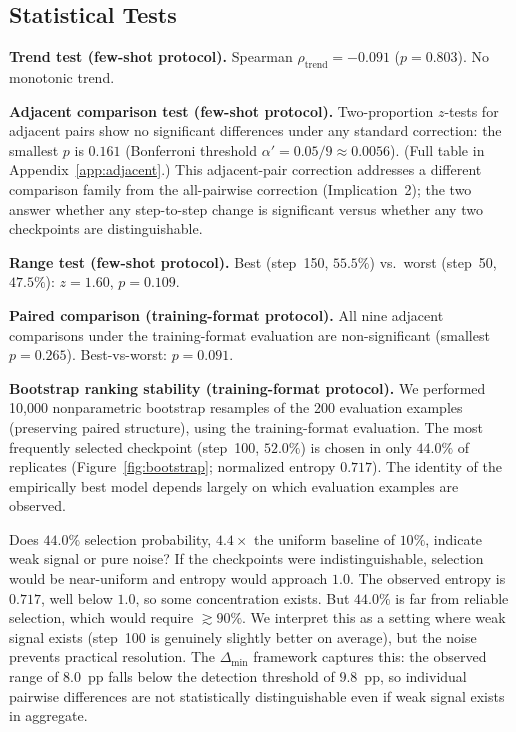 \documentclass[pdflatex,sn-mathphys-ay,oneside]{sn-jnl}
\theoremstyle{thmstylethree}
\begin{document}
\subsection{Statistical Tests}

\textbf{Trend test (few-shot protocol).} Spearman $\rho_{\text{trend}}=-0.091$ ($p=0.803$). No monotonic trend.

\textbf{Adjacent comparison test (few-shot protocol).} Two-proportion $z$-tests for adjacent pairs show no significant differences under any standard correction: the smallest $p$ is $0.161$ (Bonferroni threshold $\alpha' = 0.05/9 \approx 0.0056$). (Full table in Appendix~\ref{app:adjacent}.) This adjacent-pair correction addresses a different comparison family from the all-pairwise correction (Implication~2); the two answer whether any step-to-step change is significant versus whether any two checkpoints are distinguishable.

\textbf{Range test (few-shot protocol).} Best (step~150, $55.5\%$) vs.\ worst (step~50, $47.5\%$): $z=1.60$, $p=0.109$.

\textbf{Paired comparison (training-format protocol).} All nine adjacent comparisons under the training-format evaluation are non-significant (smallest $p=0.265$). Best-vs-worst: $p=0.091$.

\textbf{Bootstrap ranking stability (training-format protocol).} We performed 10,000 nonparametric bootstrap resamples of the 200 evaluation examples (preserving paired structure), using the training-format evaluation. The most frequently selected checkpoint (step~100, $52.0\%$) is chosen in only $44.0\%$ of replicates (Figure~\ref{fig:bootstrap}; normalized entropy $0.717$). The identity of the empirically best model depends largely on which evaluation examples are observed.

Does $44.0\%$ selection probability, $4.4\times$ the uniform baseline of $10\%$, indicate weak signal or pure noise? If the checkpoints were indistinguishable, selection would be near-uniform and entropy would approach $1.0$. The observed entropy is $0.717$, well below $1.0$, so some concentration exists. But $44.0\%$ is far from reliable selection, which would require $\gtrsim90\%$. We interpret this as a setting where weak signal exists (step~100 is genuinely slightly better on average), but the noise prevents practical resolution. The $\Delta_{\min}$ framework captures this: the observed range of $8.0$~pp falls below the detection threshold of $9.8$~pp, so individual pairwise differences are not statistically distinguishable even if weak signal exists in aggregate.
\end{document}
